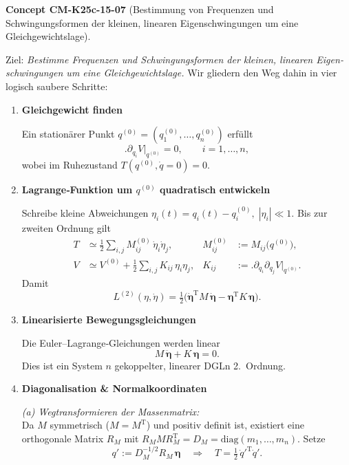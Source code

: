 \documentclass[10pt, letterpaper]{article}
\newcommand{\CustomHeading}[3]{%
  \par\medskip\noindent%
  \textbf{#1 #2} \textnormal{(#3)}.\enskip%
}
\newenvironment{CONC}[2]{\begin{unitbox}\CustomHeading{Concept}{#1}{#2}}{\end{unitbox}}
\begin{document}
\begin{CONC}{CM-K25c-15-07}{Bestimmung von Frequenzen und Schwingungsformen der kleinen, linearen Eigen­schwingungen um eine Gleichgewichtslage}
Ziel: \emph{Bestimme Frequenzen und Schwingungsformen der
kleinen, linearen Eigen­schwingungen um
eine Gleichgewichtslage.}
Wir gliedern den Weg dahin in vier logisch saubere Schritte:
\begin{enumerate}[label=\textbf{\arabic*.},wide=0pt,leftmargin=*]
\item \textbf{Gleichgewicht finden}

Ein stationärer Punkt
\(q^{(0)}=(q^{(0)}_1,\dots,q^{(0)}_n)\) erfüllt
\[
  \bigl.\partial_{q_i}V\bigr|_{q^{(0)}} = 0,
  \qquad i=1,\dots,n ,
\]
wobei im Ruhezustand
\(T(q^{(0)},\dot q=0)=0\).
\item \textbf{Lagrange‐Funktion um $q^{(0)}$ quadratisch entwickeln}

Schreibe kleine Abweichungen
\(
  \eta_i(t) = q_i(t)-q_i^{(0)},\; |\eta_i|\ll 1 .
\)
Bis zur zweiten Ordnung gilt
\begin{align*}
  T &\simeq \tfrac12
        \sum_{i,j}M_{ij}^{(0)}\,\dot\eta_i\dot\eta_j, &
  M_{ij}^{(0)}&:=M_{ij}\bigl(q^{(0)}\bigr), \\[2pt]
  V &\simeq V^{(0)}+
        \tfrac12\sum_{i,j}K_{ij}\,\eta_i\eta_j, &
  K_{ij}&:=\bigl.\partial_{q_i}\partial_{q_j}V\bigr|_{q^{(0)}} .
\end{align*}
Damit
\[
  L^{(2)}(\eta,\dot\eta)=
  \tfrac12\!\bigl(\dot{\boldsymbol\eta}^{\mathrm T}
                 M\,\dot{\boldsymbol\eta}-
                 \boldsymbol\eta^{\mathrm T}
                 K\,\boldsymbol\eta\bigr).
\]

\item \textbf{Linearisierte Bewegungsgleichungen}

Die Euler–Lagrange‐Gleichungen werden linear
\[
  M\,\ddot{\boldsymbol\eta}+K\,\boldsymbol\eta=0.
\]
Dies ist ein System $n$ gekoppelter, linearer DGLn 2.~Ordnung.

\item \textbf{Diagonalisation \& Normalkoordinaten}

\emph{(a) Wegtransformieren der Massenmatrix:}\\
Da $M$ symmetrisch (\(M=M^{\mathrm T}\)) und positiv definit ist,
existiert eine orthogonale Matrix $R_M$ mit
\(R_M M R_M^{\mathrm T}=D_M=\mathrm{diag}(m_1,\dots,m_n)\).
Setze
\[
  q' := D_M^{-1/2} R_M\,\boldsymbol\eta
  \quad\Longrightarrow\quad
  T=\tfrac12\,\dot{q}'^{\mathrm T}\dot{q}' .
\]


\end{enumerate}
\end{CONC}
\end{document}
